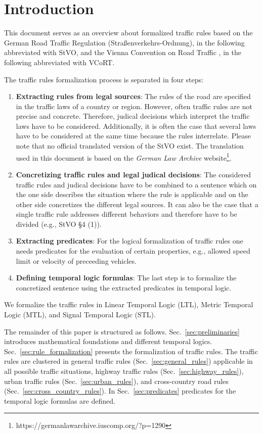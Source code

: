 
\section{Introduction}
This document serves as an overview about formalized traffic rules based on the German Road Traffic
Regulation (Stra\ss{}enverkehrs-Ordnung), in the following abbreviated with StVO, and the Vienna Convention on Road Traffic \cite{vienna_convention_1968}, in the following abbreviated with VCoRT. 

The traffic rules formalization process is separated in four steps:
\begin{enumerate}
\item \textbf{Extracting rules from legal sources}: The rules of the road are specified in the traffic laws of a country or region. However, often traffic rules are not precise and concrete. Therefore, judical decisions which interpret the traffic laws have to be considered. Additionally, it is often the case that several laws have to be considered at the same time because the rules interrelate. Please note that no official translated version of the StVO exist. The translation used in this document is based on the \textit{German Law Archive} website\footnote{https://germanlawarchive.iuscomp.org/?p=1290}.

\item \textbf{Concretizing traffic rules and legal judical decisions}: The considered traffic rules and judical decisions have to be combined to a sentence which on the one side describes the situation where the rule is applicable and on the other side concretizes the different legal sources. It can also be the case that a single traffic rule addresses different behaviors and therefore have to be divided (e.g., StVO \S 4 (1)).

\item \textbf{Extracting predicates}: For the logical formalization of traffic rules one needs predicates for the evaluation of certain properties, e.g., allowed speed limit or velocity of preceeding vehicles.

\item \textbf{Defining temporal logic formulas}: The last step is to formalize the concretized sentence using the extracted predicates in temporal logic.
\end{enumerate}

We formalize the traffic rules in Linear Temporal Logic (LTL), Metric Temporal Logic (MTL), and Signal Temporal Logic (STL).

The remainder of this paper is structured as follows. Sec.~\ref{sec:preliminaries} introduces mathematical foundations and different temporal logics. Sec.~\ref{sec:rule_formalization} presents the formalization of traffic rules. The traffic rules are clustered in general traffic rules (Sec.~\ref{sec:general_rules}) applicable in all possible traffic situations, highway traffic rules (Sec.~\ref{sec:highway_rules}), urban traffic rules (Sec.~\ref{sec:urban_rules}), and cross-country road rules (Sec.~\ref{sec:cross_country_rules}). In Sec.~\ref{sec:predicates} predicates for the temporal logic formulas are defined.